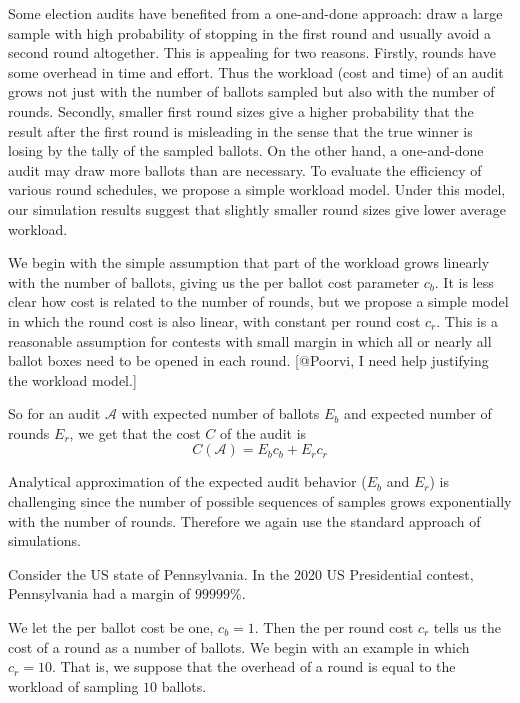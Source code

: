 Some election audits have benefited from a one-and-done approach: draw a large sample with high probability of stopping in the first round and usually avoid a second round altogether. This is appealing for two reasons. Firstly, rounds have some overhead in time and effort. Thus the workload (cost and time) of an audit grows not just with the number of ballots sampled but also with the number of rounds. Secondly, smaller first round sizes give a higher probability that the result after the first round is misleading in the sense that the true winner is losing by the tally of the sampled ballots. On the other hand, a one-and-done audit may draw more ballots than are necessary. To evaluate the efficiency of various round schedules, we propose a simple workload model. Under this model, our simulation results suggest that slightly smaller round sizes give lower average workload. 

We begin with the simple assumption that part of the workload grows linearly with the number of ballots, giving us the per ballot cost parameter $c_{b}$. It is less clear how cost is related to the number of rounds, but we propose a simple model in which the round cost is also linear, with constant per round cost $c_{r}$. This is a reasonable assumption for contests with small margin in which all or nearly all ballot boxes need to be opened in each round. [@Poorvi, I need help justifying the workload model.]

So for an audit $\mathcal{A}$ with expected number of ballots $E_{b}$ and expected number of rounds $E_{r}$, we get that the cost $C$ of the audit is
\begin{equation}
C(\mathcal{A}) = E_b c_b + E_r c_r
\label{eq:cost}
\end{equation}

Analytical approximation of the expected audit behavior ($E_b$ and $E_r$) is challenging since the number of possible sequences of samples grows exponentially with the number of rounds. 
Therefore we again use the standard approach of simulations.

Consider the US state of Pennsylvania. In the 2020 US Presidential contest, Pennsylvania had a margin of $99999\%$.

We let the per ballot cost be one, $c_b=1$. Then the per round cost $c_r$ tells us the cost of a round as a number of ballots. We begin with an example in which $c_r=10$. That is, we suppose that the overhead of a round is equal to the workload of sampling $10$ ballots.


